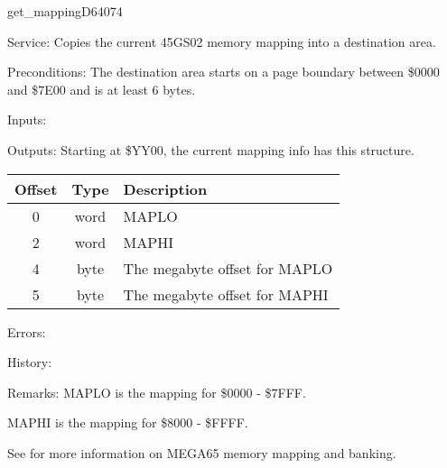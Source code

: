 \newpage
\begin{hyppotrap}{get\_mapping}{D640}{74}
\item [Service:]
  Copies the current 45GS02 memory mapping into a destination area.
\item [Preconditions:]
  The destination area starts on a page boundary between \$0000 and \$7E00 and
  is at least 6 bytes.
\item [Inputs:]
\item [Outputs:]
  Starting at \$YY00, the current mapping info has this structure.
  {\setlength{\tabcolsep}{2mm}
  \begin{tabular}{|c|c|p{6.9cm}|}
  \hline
  \textbf{Offset} & \textbf{Type} & \textbf{Description} \\
  \hline
  0 & word & MAPLO \\
  2 & word & MAPHI \\
  4 & byte & The megabyte offset for MAPLO \\
  5 & byte & The megabyte offset for MAPHI \\
  \hline
  \end{tabular}
  }
\item [Errors:]
\item [History:]
\item [Remarks:]
  MAPLO is the mapping for \$0000 - \$7FFF.

  MAPHI is the mapping for \$8000 - \$FFFF.

  See  for more information on MEGA65 memory mapping and
  banking.
\end{hyppotrap}


